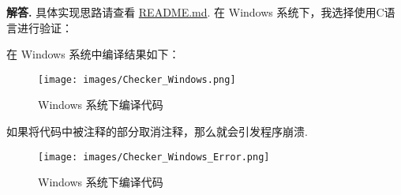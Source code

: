 \documentclass[12pt, a4paper, oneside]{ctexart}
\newenvironment{solution}{\par\noindent\textbf{解答. }}{\par}
\begin{document}
\begin{solution}
    具体实现思路请查看 \href{run:./README.md}{README.md}. 在 Windows 系统下，我选择使用C语言进行验证：
    
    在 Windows 系统中编译结果如下：
    \begin{figure}[!htbp]
        \centering
        \texttt{[image: images/Checker\_Windows.png]}
        \caption{Windows 系统下编译代码}
    \end{figure}
    \newline
    如果将代码中被注释的部分取消注释，那么就会引发程序崩溃.
    \begin{figure}[!htbp]
        \centering
        \texttt{[image: images/Checker\_Windows\_Error.png]}
        \caption{Windows 系统下编译代码}
    \end{figure}
\end{solution}
\end{document}
